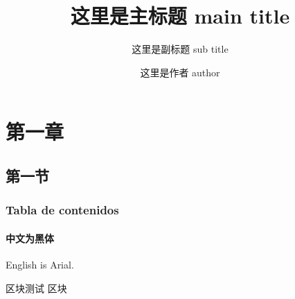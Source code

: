 \documentclass[12pt, aspectratio=169]{beamer}
\title{这里是主标题 main title}
\subtitle{这里是副标题 sub title}
\author{这里是作者 author}
\institute{这里是学院 institute}
\begin{document}
\begin{frame}
    \titlepage
\end{frame}

\section{第一章}

\subsection{第一节}

\begin{frame}
    \frametitle{Tabla de contenidos}
    \framesubtitle{中文为黑体}

    English is Arial.

    \begin{block}{区块测试}
        区块
    \end{block}

\end{frame}
\end{document}
